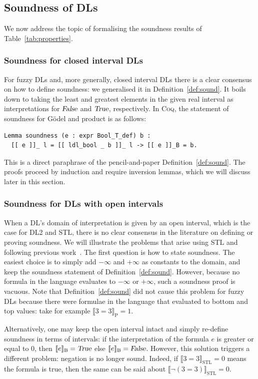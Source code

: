 \documentclass[a4paper,UKenglish,cleveref, autoref, thm-restate]{lipics-v2021}
\def\DLtwo{\textrm{DL2}}
\def\STL{\textrm{STL}}
\def\product{\textrm{product}}
\def\Godel{\textrm{Gödel}}
\def\True{\textsl{True}}
\def\False{\textsl{False}}
\newcommand{\tproduct}[1]{\llbracket #1 \rrbracket_{\textrm{P}}}
\newcommand{\tbool}[1]{\llbracket #1 \rrbracket_{\textrm{B}}}
\newcommand{\tempty}[1]{\llbracket #1 \rrbracket}
\def\coq{\textsc{Coq}}
\begin{document}
\subsection{Soundness of DLs}
\label{sec:sound}

We now address the topic of formalising the soundness results of
Table~\ref{tab:properties}.

\subsubsection*{Soundness for closed interval DLs}
For fuzzy DLs and, more generally, closed interval DLs there is a clear consensus on 
how to define soundness: we generalised it in Definition~\ref{def:sound}.
It boils down to taking the least and greatest elements in the given real interval as 
interpretations for $\False$ and $\True$, respectively.
In \coq, the statement of soundness for \Godel{} and \product{} is as follows:
\begin{verbatim}
Lemma soundness (e : expr Bool_T_def) b :
  [[ e ]]_ l = [[ ldl_bool _ b ]]_ l -> [[ e ]]_B = b.
\end{verbatim}
This is a direct paraphrase of the pencil-and-paper 
Definition~\ref{def:sound}. The proofs proceed by induction 
and require inversion lemmas, which we will discuss later in this section. 

\subsubsection*{Soundness for DLs with open intervals}
When a DL's domain of interpretation is given by an open interval, which is the 
case for  \DLtwo{} and \STL{},
there is no clear consensus in the literature on defining or proving soundness.
We will illustrate the problems that arise using \STL{} and following previous work~\cite{ldl}.
The first question is how to state soundness. The easiest choice  is to simply add $-\infty$ and $+\infty$ as 
constants to the domain, and keep the soundness statement of Definition~\ref{def:sound}.
However, because no formula in the language evaluates to $-\infty$ or $+\infty$,
such a soundness proof is vacuous.  Note that Definition~\ref{def:sound} did not 
cause this problem for fuzzy DLs because there were formulae in the language that 
evaluated to bottom and top values: take for example $\tproduct{3 = 3} = 1$.

Alternatively, one may keep the open interval intact and simply
re-define soundness in terms of intervals: if the interpretation of
the formula $e$ is greater or equal to $0$, then $\tbool{e} = \True$
else $\tbool{e}=\False$.
%
However, this solution triggers a different problem: negation is no
longer sound. Indeed, if $\tempty{3 = 3}_{\STL} = 0$ means the formula
is true, then the same can be said about
$\tempty{\neg (3 = 3)}_{\STL} = 0$.
\end{document}
